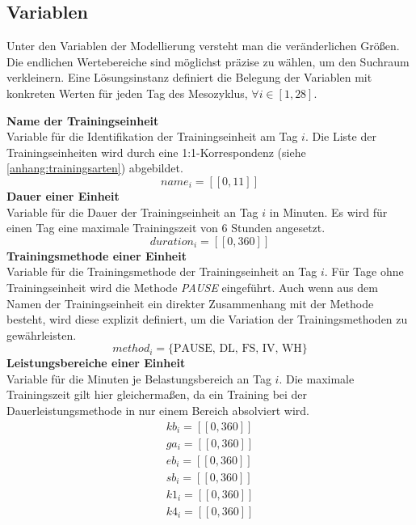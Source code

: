 \subsection{Variablen}
Unter den Variablen der Modellierung versteht man die veränderlichen Größen. Die endlichen Wertebereiche sind möglichst präzise zu wählen, um den Suchraum verkleinern. Eine Lösungsinstanz definiert die Belegung der Variablen mit konkreten Werten für jeden Tag des Mesozyklus, $\forall i \in [1, 28]$.\par
\textbf{Name der Trainingseinheit} \\[0.2em]
Variable für die Identifikation der Trainingseinheit am Tag $i$. Die Liste der Trainingseinheiten wird durch eine 1:1-Korrespondenz (siehe \ref{anhang:trainingsarten}) abgebildet.
\begin{equation}
    name_i = [\![0, 11]\!]
\end{equation}
\textbf{Dauer einer Einheit} \\[0.2em]
Variable für die Dauer der Trainingseinheit an Tag $i$ in Minuten. Es wird für einen Tag eine maximale Trainingszeit von 6 Stunden angesetzt.
\begin{equation} 
    duration_i = [\![0, 360]\!] \end{equation} 
\textbf{Trainingsmethode einer Einheit} \\[0.2em]
Variable für die Trainingsmethode der Trainingseinheit an Tag $i$. Für Tage ohne Trainingseinheit wird die Methode \textit{PAUSE} eingeführt. Auch wenn aus dem Namen der Trainingseinheit ein direkter Zusammenhang mit der Methode besteht, wird diese explizit definiert, um die Variation der Trainingsmethoden zu gewährleisten.
\begin{equation}
    method_i = \{\text{PAUSE, DL, FS, IV, WH}\}
\end{equation} 
\textbf{Leistungsbereiche einer Einheit} \\[0.2em]
Variable für die Minuten je Belastungsbereich an Tag $i$. Die maximale Trainingszeit gilt hier gleichermaßen, da ein Training bei der Dauerleistungsmethode in nur einem Bereich absolviert wird. \newline
\begin{equation} 
\begin{array}{c}
    kb_i = [\![0, 360]\!] \\
    ga_i = [\![0, 360]\!] \\
    eb_i = [\![0, 360]\!] \\
    sb_i = [\![0, 360]\!] \\
    k1_i = [\![0, 360]\!] \\
    k4_i = [\![0, 360]\!] \\
\end{array}
\end{equation} 
